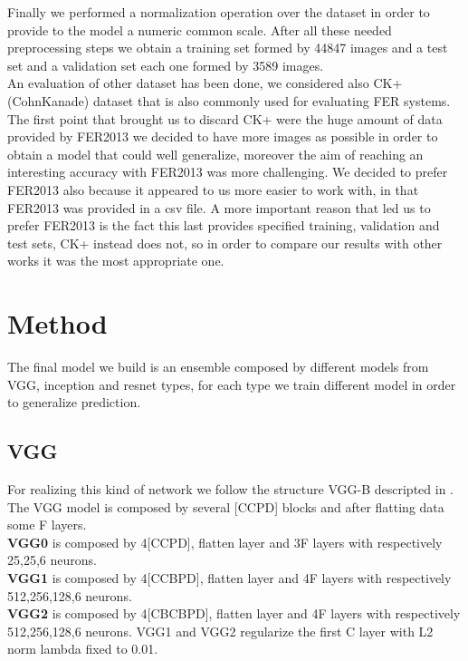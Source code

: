 \documentclass[10pt,twocolumn,letterpaper]{article}
\begin{document}
Finally we performed a normalization operation over the dataset in order to provide to the model a numeric common scale.
After all these needed preprocessing steps we obtain a training set formed by 44847 images and a test set and a validation set each one formed by 3589 images.
\\An evaluation of other dataset has been done, we considered also CK+ (CohnKanade) dataset that is also commonly used for evaluating FER systems.
The first point that brought us to discard CK+ were the huge amount of data provided by FER2013 we decided to have more images as possible in order to
obtain a model that could well generalize, moreover the aim of reaching an interesting accuracy with FER2013 was more challenging.
We decided to prefer FER2013 also because it appeared to us more easier to work with, in that FER2013 was provided in a csv file.
A more important reason that led us to prefer FER2013 is the fact this last provides specified training, validation and test sets, CK+ instead does not, so in order
to compare our results with other works it was the most appropriate one.
\section{Method}
The final model we build is an ensemble composed by different models from VGG, inception and resnet types, for each type we train different model in order to generalize prediction. 
\subsection*{VGG}
For realizing this kind of network we follow the structure VGG-B descripted in \cite{24}.
The VGG model is composed by several [CCPD] blocks and after flatting data some F layers.
\\{\bf VGG0} is composed by 4[CCPD], flatten layer and 3F layers with respectively 25,25,6 neurons.
\\{\bf VGG1} is composed by 4[CCBPD], flatten layer and 4F layers with respectively 512,256,128,6 neurons.
\\{\bf VGG2} is composed by 4[CBCBPD], flatten layer and 4F layers with respectively 512,256,128,6 neurons.
VGG1 and VGG2 regularize the first C layer with L2 norm lambda fixed to 0.01.
\end{document}
